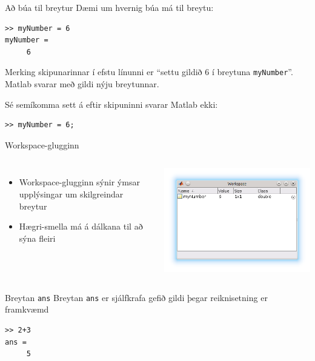 \documentclass[handout]{beamer}
\begin{document}
\begin{frame}[fragile]{Að búa til breytur}
Dæmi um hvernig búa má til breytu:
\begin{verbatim}
>> myNumber = 6
myNumber =  
     6
\end{verbatim}
Merking skipunarinnar í efstu línunni er ``settu gildið $6$ í breytuna \texttt{myNumber}''. Matlab svarar með gildi nýju breytunnar.

Sé semíkomma sett á eftir skipuninni svarar Matlab ekki:
\begin{verbatim}
>> myNumber = 6;
\end{verbatim}
\end{frame}

\begin{frame}{Workspace-glugginn}
\begin{columns}
\begin{itemize}
 \item Workspace-glugginn sýnir ýmsar upplýsingar um skilgreindar breytur
 \item Hægri-smella má á dálkana til að sýna fleiri
\end{itemize}
\includegraphics[width=\linewidth]{Pics/workspace-window}
\end{columns}
\end{frame}

\begin{frame}[fragile]{Breytan \texttt{ans}}
Breytan \texttt{ans} er sjálfkrafa gefið gildi þegar reiknisetning er framkvæmd 
\begin{verbatim}
>> 2+3
ans = 
     5
\end{verbatim}
\end{frame}
\end{document}
